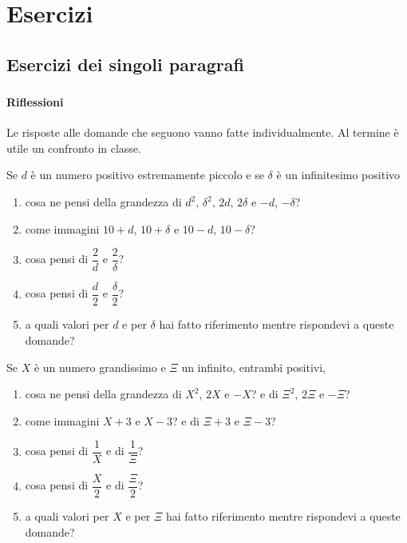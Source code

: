 

\section{Esercizi}
\subsection{Esercizi dei singoli paragrafi}

\subsubsection*{}

\paragraph{Riflessioni}
Le risposte alle domande che seguono vanno fatte individualmente. Al termine è 
utile un confronto in classe.
\begin{esercizio}
Se $d$ è un numero positivo estremamente piccolo e se $\delta$ è un 
infinitesimo positivo
\begin{enumerate} [noitemsep]
\item  cosa ne pensi della grandezza di $d^2$, $\delta^2$, $2d$, $2\delta$ e 
$-d$, $-\delta$?
\item come immagini $10+d$, $10+\delta$ e $10-d$, $10-\delta$?
\item cosa pensi di $\dfrac{2}{d}$ e $\dfrac{2}{\delta}$?
\item cosa pensi di $\dfrac{d}{2}$ e $\dfrac{\delta}{2}$?
\item a quali valori per $d$ e per $\delta$ hai fatto riferimento mentre
 rispondevi a queste domande?
\end{enumerate}
\end{esercizio}

\begin{esercizio}
Se $X$ è un numero grandissimo e $\Xi$ un infinito, entrambi positivi,
\begin{enumerate} [noitemsep]
\item cosa ne pensi della grandezza di $X^2$, $2X$ e $-X$? e di $\Xi^2$, $2\Xi$
e $-\Xi$?
\item come immagini $X+3$ e $X-3$? e di $\Xi+3$ e $\Xi-3$?
\item cosa pensi di $\dfrac{1}{X}$ e di $\dfrac{1}{\Xi}$?
\item cosa pensi di $\dfrac{X}{2}$ e di $\dfrac{\Xi}{2}$?
\item a quali valori per $X$ e per $\Xi$ hai fatto riferimento mentre
 rispondevi a queste domande?
 \end{enumerate}
\end{esercizio}

